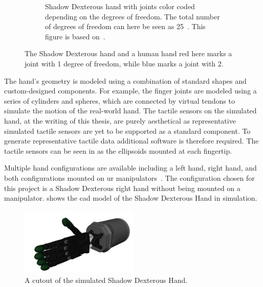 \begin{figure}[h]
\begin{subfigure}[b]{0.48\textwidth}
		\caption{Shadow Dexterous hand with joints color coded depending on the degrees of freedom. The total number of degrees of freedom can here be seen as \num{25}~\cite{design-and-development-of-a-bilateral-therapeutic-hand-device-for-stroke-rehabilitation}. This figure is based on~\cite{svg-skeleton-hand}.}
		\label{fig:human-hand-skeleton}
	\end{subfigure}
	\caption{The Shadow Dexterous hand and a human hand red here marks a joint with \num{1} degree of freedom, while blue marks a joint with \num{2}.}
	\label{fig:hands-dof}
\end{figure}

The hand's geometry is modeled using a combination of standard shapes and custom-designed components. For example, the finger joints are modeled using a series of cylinders and spheres, which are connected by virtual tendons to simulate the motion of the real-world hand. The tactile sensors on the simulated hand, at the writing of this thesis, are purely aesthetical as representative simulated tactile sensors are yet to be supported as a standard component. To generate representative tactile data additional software is therefore required. The tactile sensors can be seen in  as the ellipsoids mounted at each fingertip. \medskip

Multiple hand configurations are available including a left hand, right hand, and both configurations mounted on \gls{ur} manipulators~\cite{shadow-hand-configurations}. The configuration chosen for this project is a Shadow Dexterous right hand without being mounted on a manipulator.  shows the \gls{cad} model of the Shadow Dexterous Hand in simulation.

\begin{figure}[h]
	\begin{small}
		\begin{center}
			\includegraphics[width=0.5\textwidth]{chapters/system-setup/fig/simulation-robot-hand.png}
		\end{center}
		\caption{A cutout of the simulated Shadow Dexterous Hand.}
		\label{fig:simulated-robot-hand}
	\end{small}
\end{figure}


